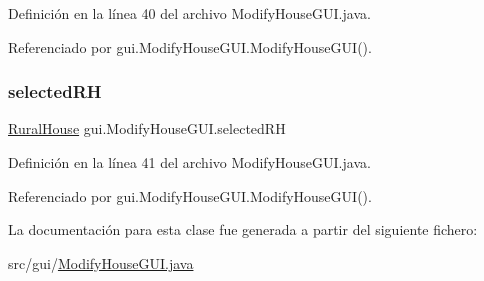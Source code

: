 Definición en la línea 40 del archivo Modify\+House\+G\+U\+I.\+java.



Referenciado por gui.\+Modify\+House\+G\+U\+I.\+Modify\+House\+G\+U\+I().

\mbox{\label{classgui_1_1_modify_house_g_u_i_a803e872ae00af5f6fd4b87837a44408c}} 
\subsubsection{\texorpdfstring{selectedRH}{selectedRH}}
{\footnotesize\ttfamily \mbox{\hyperlink{classdomain_1_1_rural_house}{Rural\+House}} gui.\+Modify\+House\+G\+U\+I.\+selected\+RH\hspace{0.3cm}{\ttfamily [protected]}}



Definición en la línea 41 del archivo Modify\+House\+G\+U\+I.\+java.



Referenciado por gui.\+Modify\+House\+G\+U\+I.\+Modify\+House\+G\+U\+I().



La documentación para esta clase fue generada a partir del siguiente fichero\+:\begin{DoxyCompactItemize}
\item 
src/gui/\mbox{\hyperlink{_modify_house_g_u_i_8java}{Modify\+House\+G\+U\+I.\+java}}\end{DoxyCompactItemize}
